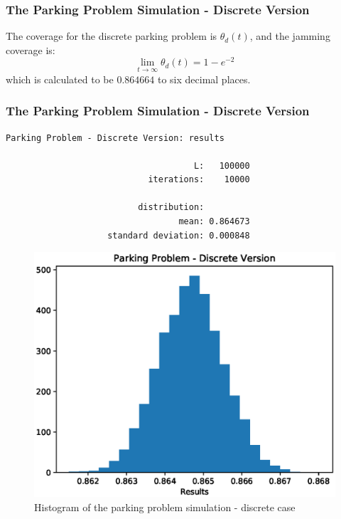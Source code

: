 \documentclass{beamer}
\begin{document}
\begin{frame}[fragile]
    \frametitle{The Parking Problem Simulation - Discrete Version}
    The coverage for the discrete parking problem is $\theta_{d}(t)$, and the jamming coverage is: 
    \[
    	\lim_{t \to \infty} \theta_{d}(t) = 1 - e^{-2}
    \]
    which is calculated to be $0.864664$ to six decimal places.
\end{frame}

\begin{frame}[fragile]
    \frametitle{The Parking Problem Simulation - Discrete Version}
	\begin{lstlisting}[numbers=none]
    Parking Problem - Discrete Version: results

                                     L:   100000
                            iterations:    10000

                          distribution:
                                  mean: 0.864673
                    standard deviation: 0.000848

	\end{lstlisting}
\end{frame}

\begin{frame}
    \begin{figure}
    	\centering
    	\includegraphics[scale = 0.5]{parking_simulation_01.eps}
    	\caption{Histogram of the parking problem simulation - discrete case}
    \end{figure}
\end{frame}
\end{document}
